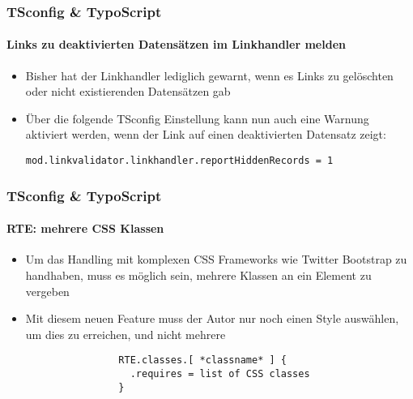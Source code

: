 
\begin{frame}[fragile]
	\frametitle{TSconfig \& TypoScript}
	\framesubtitle{Links zu deaktivierten Datensätzen im Linkhandler melden}

	\begin{itemize}
		\item Bisher hat der Linkhandler lediglich gewarnt, wenn es Links zu gelöschten oder nicht existierenden Datensätzen gab
		\item Über die folgende TSconfig Einstellung kann nun auch eine Warnung aktiviert werden, wenn der Link auf einen deaktivierten Datensatz zeigt:

			\lstinline!mod.linkvalidator.linkhandler.reportHiddenRecords = 1!

	\end{itemize}

\end{frame}


\begin{frame}[fragile]
	\frametitle{TSconfig \& TypoScript}
	\framesubtitle{RTE: mehrere CSS Klassen}

	\begin{itemize}
		\item Um das Handling mit komplexen CSS Frameworks wie Twitter Bootstrap zu handhaben, muss es möglich sein, mehrere Klassen an ein Element zu vergeben
		\item Mit diesem neuen Feature muss der Autor nur noch einen Style auswählen, um dies zu erreichen, und nicht mehrere

			\begin{lstlisting}
				RTE.classes.[ *classname* ] {
				  .requires = list of CSS classes
				}
			\end{lstlisting}

	\end{itemize}

\end{frame}

